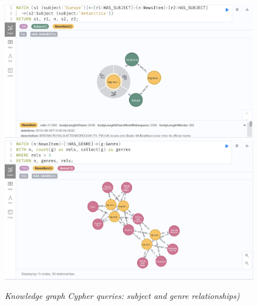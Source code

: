 \documentclass[11pt]{article}
\begin{document}
\begin{figure}
  \includegraphics[scale=0.2]{00-news-items-antarctica-europe}
  \includegraphics[scale=0.2]{00-news-items-more-than-five-genres}
  \caption{\textit{Knowledge graph Cypher queries: subject and genre relationships)}}
\end{figure}
\end{document}
